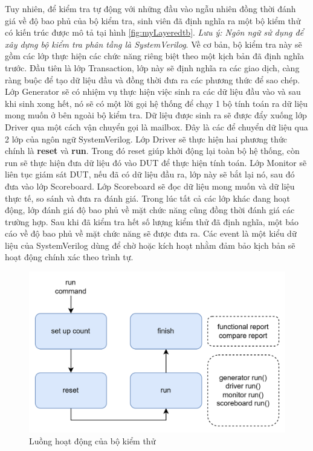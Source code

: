 Tuy nhiên, để kiểm tra tự động với những đầu vào ngẫu nhiên đồng thời đánh giá về độ bao phủ của bộ kiểm tra, sinh viên đã định nghĩa ra một bộ kiểm thử có kiến trúc được mô tả tại hình \ref{fig:myLayeredtb}. \textit{Lưu ý: Ngôn ngữ sử dụng để xây dựng bộ kiểm tra phân tầng là SystemVerilog}. Về cơ bản, bộ kiểm tra này sẽ gồm các lớp thực hiện các chức năng riêng biệt theo một kịch bản đã định nghĩa trước. Đầu tiên là lớp Transaction, lớp này sẽ định nghĩa ra các giao dịch, càng ràng buộc để tạo dữ liệu đầu và đồng thời đưa ra các phương thức để sao chép. Lớp Generator sẽ có nhiệm vụ thực hiện việc sinh ra các dữ liệu đầu vào và sau khi sinh xong hết, nó sẽ có một lời gọi hệ thống để chạy 1 bộ tính toán ra dữ liệu mong muốn ở bên ngoài bộ kiểm tra. Dữ liệu được sinh ra sẽ được đẩy xuống lớp Driver qua một cách vận chuyển gọi là mailbox. Đây là các để chuyển dữ liệu qua 2 lớp của ngôn ngữ SystemVerilog. Lớp Driver sẽ thực hiện hai phương thức chính là \textbf{reset} và \textbf{run}. Trong đó reset giúp khởi động lại toàn bộ hệ thống, còn run sẽ thực hiện đưa dữ liệu đó vào DUT để thực hiện tính toán. Lớp Monitor sẽ liên tục giám sát DUT, nếu đã có dữ liệu đầu ra, lớp này sẽ bắt lại nó, sau đó đưa vào lớp Scoreboard. Lớp Scoreboard sẽ đọc dữ liệu mong muốn và dữ liệu thực tế, so sánh và đưa ra đánh giá. Trong lúc tất cả các lớp khác đang hoạt động, lớp đánh giá độ bao phủ về mặt chức năng cũng đồng thời đánh giá các trường hợp. Sau khi đã kiểm tra hết số lượng kiểm thử đã định nghĩa, một báo cáo về độ bao phủ về mặt chức năng sẽ được đưa ra. Các event là một kiểu dữ liệu của SystemVerilog dùng để chờ hoặc kích hoạt nhằm đảm bảo kịch bản sẽ hoạt động chính xác theo trình tự. 
\begin{figure}[!hb]
	\centering
	\includegraphics[width=1\linewidth]{figures/soc2.png}
	\caption{Luồng hoạt động của bộ kiểm thử}
	\label{fig:soc2}
\end{figure}

